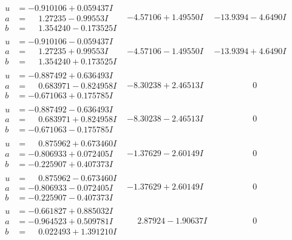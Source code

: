 \documentclass[1p]{elsarticle_modified}
\theoremstyle{definition}
\begin{document}
$$\begin{array}{c|c|c}
\begin{aligned}
u &= -0.910106 + 0.059437 I \\
a &= \phantom{-}1.27235 - 0.99553 I \\
b &= \phantom{-}1.354240 - 0.173525 I\end{aligned}
 & -4.57106 + 1.49550 I & -13.9394 - 4.6490 I \\ \hline\begin{aligned}
u &= -0.910106 - 0.059437 I \\
a &= \phantom{-}1.27235 + 0.99553 I \\
b &= \phantom{-}1.354240 + 0.173525 I\end{aligned}
 & -4.57106 - 1.49550 I & -13.9394 + 4.6490 I \\ \hline\begin{aligned}
u &= -0.887492 + 0.636493 I \\
a &= \phantom{-}0.683971 - 0.824958 I \\
b &= -0.671063 + 0.175785 I\end{aligned}
 & -8.30238 + 2.46513 I & \phantom{-0.000000 } 0 \\ \hline\begin{aligned}
u &= -0.887492 - 0.636493 I \\
a &= \phantom{-}0.683971 + 0.824958 I \\
b &= -0.671063 - 0.175785 I\end{aligned}
 & -8.30238 - 2.46513 I & \phantom{-0.000000 } 0 \\ \hline\begin{aligned}
u &= \phantom{-}0.875962 + 0.673460 I \\
a &= -0.806933 + 0.072405 I \\
b &= -0.225907 + 0.407373 I\end{aligned}
 & -1.37629 - 2.60149 I & \phantom{-0.000000 } 0 \\ \hline\begin{aligned}
u &= \phantom{-}0.875962 - 0.673460 I \\
a &= -0.806933 - 0.072405 I \\
b &= -0.225907 - 0.407373 I\end{aligned}
 & -1.37629 + 2.60149 I & \phantom{-0.000000 } 0 \\ \hline\begin{aligned}
u &= -0.661827 + 0.885032 I \\
a &= -0.964523 + 0.509781 I \\
b &= \phantom{-}0.022493 + 1.391210 I\end{aligned}
 & \phantom{-}2.87924 - 1.90637 I & \phantom{-0.000000 } 0 \\ \hline\begin{aligned}

\end{aligned}
\end{array}$$
\end{document}

